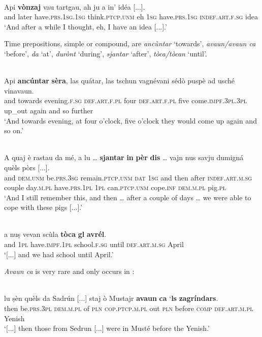 \ea
\label{}
\\
\gll Api \textbf{vònzaj} vau tartgau, ah ju a in’ idéa [...].   \\
and later have.\textsc{prs.1sg.1sg} think.\textsc{ptcp.unm} eh \textsc{1sg} have.\textsc{prs.1sg} \textsc{indef.art.f.sg} idea\\
\glt `And after a while I thought, eh, I have an idea [...].'
\z

Time prepositions, simple or compound, are \textit{ancùntar} `towards', \textit{avaun/avaun ca} `before', \textit{da} `at', \textit{durònt} `during', \textit{sjantar} `after', \textit{tòca/tòcan} `until'.

\ea
\label{}
\\
\gll Api \textbf{ancúntar} \textbf{sèra}, las quátar, las tschun vagnévani sédò puspè ad usché vinavaun.\\
and towards evening.\textsc{f.sg} \textsc{def.art.f.pl} four \textsc{def.art.f.pl} five come.\textsc{impf.3pl.3pl} up\_out again and so further\\
\glt `And towards evening, at four o'clock, five o'clock they would come up again and so on.'
\z

\ea
\label{}
\\
\gll    A quaj è rastau da mé, a lu … \textbf{sjantar} \textbf{in} \textbf{pèr} \textbf{dis} … vajn nus savju dumigná quèls pòrs [...].\\
and \textsc{dem.unm} be.\textsc{prs.3sg} remain.\textsc{ptcp.unm}  \textsc{dat}  \textsc{1sg} and then {} after \textsc{indef.art.m.sg} couple  day.\textsc{m.pl} {} have.\textsc{prs.1pl} \textsc{1pl} can.\textsc{ptcp.unm} cope.\textsc{inf} \textsc{dem.m.pl} pig.\textsc{pl}\\
\glt `And I still remember this, and then … after a couple of days … we were able to cope with these pigs [...].'
\z

\ea
\label{}
\\
\gll [...] a nuṣ vevan scùla \textbf{tòca} \textbf{gl} \textbf{avrél}.\\
{} and \textsc{1pl} have.\textsc{impf.1pl} school.\textsc{f.sg} until \textsc{def.art.m.sg} April\\
\glt `[...] and we had school until April.'
\z

\textit{Avaun ca} is very rare and only occurs in \citet{Büchli1966}:

\ea
\label{}
 {\citealt[132]{Büchli1966}}\\
\gll [...] lu ṣèn quèls da Sadrún [...] staj ò Mustajr \textbf{avaun} \textbf{ca} `\textbf{ls} \textbf{zagríndars}.\\
{} then be.\textsc{prs.3pl} \textsc{dem.m.pl} of \textsc{pln} {} \textsc{cop.ptcp.m.pl} out \textsc{pln} before \textsc{comp} \textsc{def.art.m.pl} Yenish\\
\glt `[...] then those from Sedrun [...] were in Musté before the Yenish.'
\z

